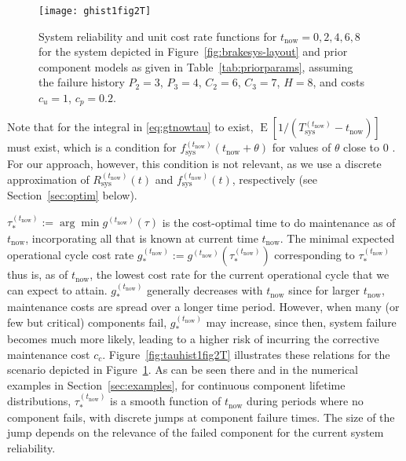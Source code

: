 \documentclass[authoryear]{elsarticle}
\newcommand{\E}{\operatorname{E}}
\def\tnow{t_\text{now}}
\newcommand{\Rsysnow}{R^{(t_\text{now})}_\text{sys}}
\newcommand{\Tsysnow}{T^{(t_\text{now})}_\text{sys}}
\newcommand{\fsysnow}{f^{(t_\text{now})}_\text{sys}}
\newcommand{\gnow}{g^{(\tnow)}}
\newcommand{\tausnow}{\tau_*^{(\tnow)}}
\newcommand{\tstarnow}{t_*^{(\tnow)}}
\newcommand{\gstarnow}{g_*^{(\tnow)}}
\newcommand{\gtotalnow}{g_\text{total}^{(\tnow)}}
\begin{document}
\begin{figure}
\texttt{[image: ghist1fig2T]}
\caption{System reliability and unit cost rate functions for $\tnow = 0,2,4,6,8$
for the system depicted in Figure~\ref{fig:brakesys-layout}
and prior component models as given in Table~\ref{tab:priorparams},
assuming the failure history $P_2 = 3$, $P_3 = 4$, $C_2 = 6$, $C_3 = 7$, $H = 8$,
and costs $c_u = 1$, $c_p = 0.2$.}
\label{fig:ghist1fig2T}
\end{figure}

Note that for the integral in \eqref{eq:gtnowtau} to exist,
$\E[1/(\Tsysnow - \tnow)]$ must exist,
which is a condition for $\fsysnow(\tnow + \theta)$ for values of $\theta$ close to $0$ \citep{2006:coolen-schrijner-coolen}.
For our approach, however, this condition is not relevant,
as we use a discrete approximation of $\Rsysnow(t)$ and $\fsysnow(t)$, respectively
(see Section~\ref{sec:optim} below).

$\tausnow := \arg\min \gnow(\tau)$
is the cost-optimal time to do maintenance as of $\tnow$,
incorporating all that is known at current time $\tnow$.
The minimal expected operational cycle cost rate $\gstarnow := \gnow(\tausnow)$ corresponding to $\tausnow$
thus is, as of $\tnow$, the lowest cost rate for the current operational cycle
that we can expect to attain.
$\gstarnow$ generally decreases with $\tnow$ since for larger $\tnow$, maintenance costs are spread over a longer time period.
However, when many (or few but critical) components fail, $\gstarnow$ may increase,
since then, system failure becomes much more likely, leading to a higher risk of incurring the corrective maintenance cost $c_c$.
Figure~\ref{fig:tauhist1fig2T} illustrates these relations for the scenario depicted in Figure~\ref{fig:ghist1fig2T}.
%
As can be seen there and in the numerical examples in Section~\ref{sec:examples},
for continuous component lifetime distributions,
$\tausnow$ is a smooth function of $\tnow$ during periods where no component fails,
with discrete jumps at component failure times.
The size of the jump depends on the relevance of the failed component for the current system reliability.
\end{document}
